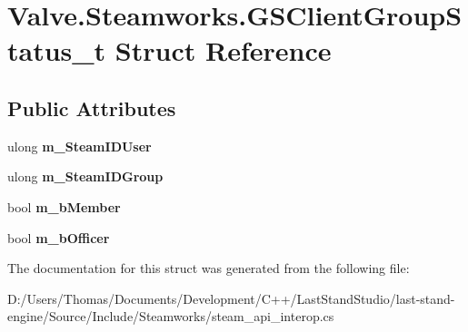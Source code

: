 \hypertarget{structValve_1_1Steamworks_1_1GSClientGroupStatus__t}{}\section{Valve.\+Steamworks.\+G\+S\+Client\+Group\+Status\+\_\+t Struct Reference}
\label{structValve_1_1Steamworks_1_1GSClientGroupStatus__t}
\subsection*{Public Attributes}
\begin{DoxyCompactItemize}
\item 
\hypertarget{structValve_1_1Steamworks_1_1GSClientGroupStatus__t_a60e987e9a652a479ef18419eb380d1b1}{}ulong {\bfseries m\+\_\+\+Steam\+I\+D\+User}\label{structValve_1_1Steamworks_1_1GSClientGroupStatus__t_a60e987e9a652a479ef18419eb380d1b1}

\item 
\hypertarget{structValve_1_1Steamworks_1_1GSClientGroupStatus__t_aa6a20821d9a9169f1e7f7134c4bc747a}{}ulong {\bfseries m\+\_\+\+Steam\+I\+D\+Group}\label{structValve_1_1Steamworks_1_1GSClientGroupStatus__t_aa6a20821d9a9169f1e7f7134c4bc747a}

\item 
\hypertarget{structValve_1_1Steamworks_1_1GSClientGroupStatus__t_ab08045e887514cba7dd0a1503aa0ab6d}{}bool {\bfseries m\+\_\+b\+Member}\label{structValve_1_1Steamworks_1_1GSClientGroupStatus__t_ab08045e887514cba7dd0a1503aa0ab6d}

\item 
\hypertarget{structValve_1_1Steamworks_1_1GSClientGroupStatus__t_a0d82572ee2f08be01d6114b224e3055e}{}bool {\bfseries m\+\_\+b\+Officer}\label{structValve_1_1Steamworks_1_1GSClientGroupStatus__t_a0d82572ee2f08be01d6114b224e3055e}

\end{DoxyCompactItemize}


The documentation for this struct was generated from the following file\+:\begin{DoxyCompactItemize}
\item 
D\+:/\+Users/\+Thomas/\+Documents/\+Development/\+C++/\+Last\+Stand\+Studio/last-\/stand-\/engine/\+Source/\+Include/\+Steamworks/steam\+\_\+api\+\_\+interop.\+cs\end{DoxyCompactItemize}
